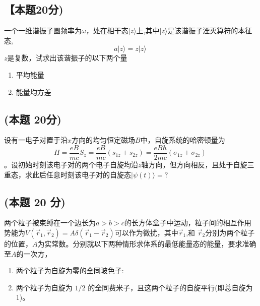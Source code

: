\subsection{【本题20分)}
一个一维谐振子圆频率为$\omega$，处在相干态$|z\rangle$上,其中$|z\rangle$是该谐振子湮灭算符的本征态,
$$a |z\rangle = z |z\rangle~$$
$z$是复数，试求出该谐振子的以下两个量
\begin{enumerate}
\item 平均能量
\item 能量均方差
\end{enumerate}
\subsection{(本题 20分)}
设有一电子对置于沿$x$方向的均匀恒定磁场$B$中，自旋系统的哈密顿量为
$$H = \frac{eB}{mc} S_z = \frac{eB}{mc} \left( s_{1z} + s_{2z} \right) = \frac{eB\hbar}{2mc} \left( \sigma_{1z} + \sigma_{2z} \right)~$$。设初始时刻该电子对的两个电子自旋均沿$z$轴方向，但方向相反，且处于自旋三重态，求此后任意时刻该电子对的自旋态$|\psi(t)\rangle=?$
\subsection{(本题 20 分)}
两个粒子被束缚在一个边长为$a>b>c$的长方体盒子中运动，粒子间的相互作用势能为$V(\vec{r}_1, \vec{r}_2) = A\delta(\vec{r}_1 - \vec{r}_2)$可以作为微扰，其中$\vec{r}_1$,和 $\vec{r}_2$分别为两个粒子的位置，$A$为实常数。分别就以下两种情形求体系的最低能量态的能量，要求准确至$A$的一次方，
\begin{enumerate}
\item 两个粒子为自旋为零的全同玻色子:
\item 两个粒子为自旋为 $1/2$ 的全同费米子，且这两个粒子的自旋平行(即总自旋为 1)。
\end{enumerate}
